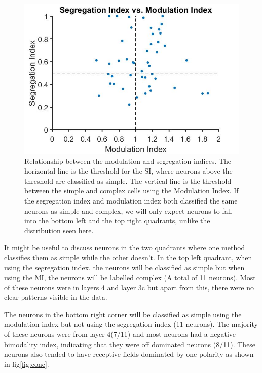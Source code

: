 	
	\begin{figure}[]
		
		\includegraphics[width=\linewidth]{LinearV1/Segindvsmodind.jpg}
		\caption{Relationship between the modulation and segregation indices. The horizontal line is the threshold for the SI, where neurons above the threshold are classified as simple. The vertical line is the threshold between the simple and complex cells using the Modulation Index. If the segregation index and modulation index both classified the same neurons as simple and complex, we will only expect neurons to fall into the bottom left and the top right quadrants, unlike the distribution seen here.}
		\label{fig:fig5}
	\end{figure}

	It might be useful to discuss neurons in the two quadrants where one method classifies them as simple while the other doesn't. In the top left quadrant, when using the segregation index, the neurons will be classified as simple but when using the MI, the neurons will be labelled complex (A total of 11 neurons). Most of these neurons were in layers 4 and layer 3c but apart from this, there were no clear patterns visible in the data.
	
	The neurons in the bottom right corner will be classified as simple using the modulation index but not using the segregation index (11 neurons). The majority of these neurons were from layer 4(7/11) and most neurons had a negative bimodality index, indicating that they were off dominated neurons (8/11). These neurons also tended to have receptive fields dominated by one polarity as shown in fig\ref{fig:conc}.
	
